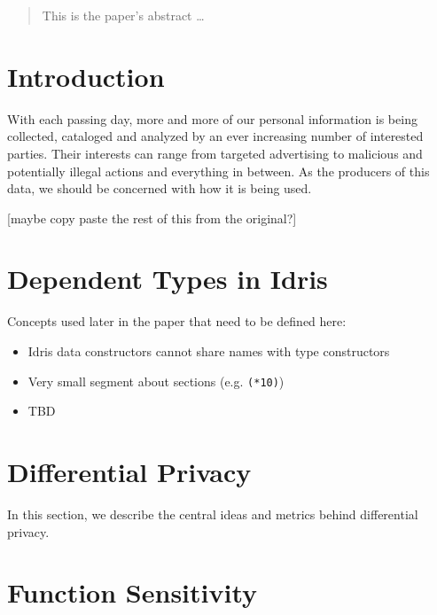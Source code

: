 \documentclass[12pt]{article}
\begin{document}
\maketitle

\lstset{language=Haskell,basicstyle=\footnotesize,frame=single,
        numbers=left}

\begin{abstract}
This is the paper's abstract \ldots
\end{abstract}

\section{Introduction}\label{sec:introduction}

With each passing day, more and more of our personal information is being collected, cataloged and analyzed by an ever increasing number of interested parties.
Their interests can range from targeted advertising to malicious and potentially illegal actions and everything in between.
As the producers of this data, we should be concerned with how it is being used.

[maybe copy paste the rest of this from the original?]

\section{Dependent Types in Idris}\label{sec:dependent_types_in_idris}

Concepts used later in the paper that need to be defined here:
\begin{itemize}
\item Idris data constructors cannot share names with type constructors
\item Very small segment about sections (e.g. \texttt{(*10)})
\item TBD
\end{itemize}

\section{Differential Privacy}\label{sec:differential_privacy}

In this section, we describe the central ideas and metrics behind differential privacy.

\section{Function Sensitivity}\label{sec:function_sensitivity}
\end{document}
